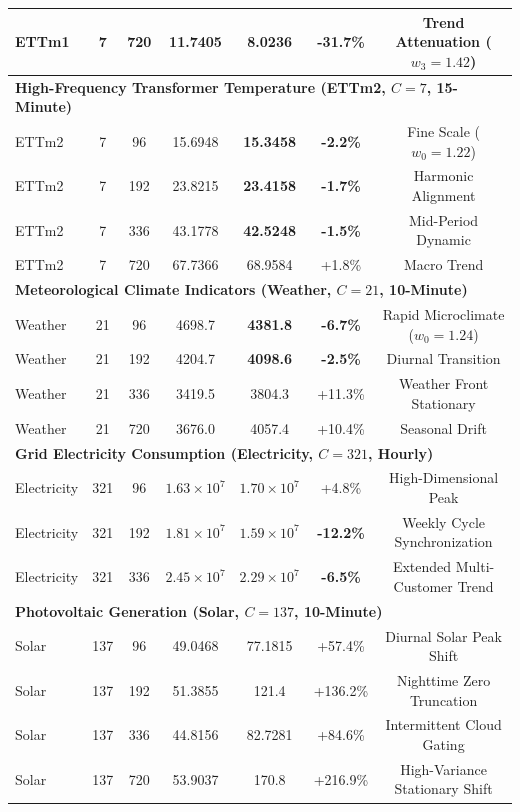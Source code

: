 \documentclass[journal]{IEEEtran}
\begin{document}
\begin{table}[!t]
\begin{tabular}{lcccccc}
ETTm1 & 7 & 720 & 11.7405 & \textbf{8.0236} & \textbf{-31.7\%} & Trend Attenuation ($w_3 = 1.42$) \\
\midrule
\multicolumn{7}{l}{\textbf{High-Frequency Transformer Temperature (ETTm2, $C=7$, 15-Minute)}} \\
ETTm2 & 7 & 96 & 15.6948 & \textbf{15.3458} & \textbf{-2.2\%} & Fine Scale ($w_0 = 1.22$) \\
ETTm2 & 7 & 192 & 23.8215 & \textbf{23.4158} & \textbf{-1.7\%} & Harmonic Alignment \\
ETTm2 & 7 & 336 & 43.1778 & \textbf{42.5248} & \textbf{-1.5\%} & Mid-Period Dynamic \\
ETTm2 & 7 & 720 & 67.7366 & 68.9584 & +1.8\% & Macro Trend \\
\midrule
\multicolumn{7}{l}{\textbf{Meteorological Climate Indicators (Weather, $C=21$, 10-Minute)}} \\
Weather & 21 & 96 & 4698.7 & \textbf{4381.8} & \textbf{-6.7\%} & Rapid Microclimate ($w_0 = 1.24$) \\
Weather & 21 & 192 & 4204.7 & \textbf{4098.6} & \textbf{-2.5\%} & Diurnal Transition \\
Weather & 21 & 336 & 3419.5 & 3804.3 & +11.3\% & Weather Front Stationary \\
Weather & 21 & 720 & 3676.0 & 4057.4 & +10.4\% & Seasonal Drift \\
\midrule
\multicolumn{7}{l}{\textbf{Grid Electricity Consumption (Electricity, $C=321$, Hourly)}} \\
Electricity & 321 & 96 & $1.63\times 10^7$ & $1.70\times 10^7$ & +4.8\% & High-Dimensional Peak \\
Electricity & 321 & 192 & $1.81\times 10^7$ & \textbf{$1.59\times 10^7$} & \textbf{-12.2\%} & Weekly Cycle Synchronization \\
Electricity & 321 & 336 & $2.45\times 10^7$ & \textbf{$2.29\times 10^7$} & \textbf{-6.5\%} & Extended Multi-Customer Trend \\
\midrule
\multicolumn{7}{l}{\textbf{Photovoltaic Generation (Solar, $C=137$, 10-Minute)}} \\
Solar & 137 & 96 & 49.0468 & 77.1815 & +57.4\% & Diurnal Solar Peak Shift \\
Solar & 137 & 192 & 51.3855 & 121.4 & +136.2\% & Nighttime Zero Truncation \\
Solar & 137 & 336 & 44.8156 & 82.7281 & +84.6\% & Intermittent Cloud Gating \\
Solar & 137 & 720 & 53.9037 & 170.8 & +216.9\% & High-Variance Stationary Shift \\

\end{tabular}
\end{table}
\end{document}
